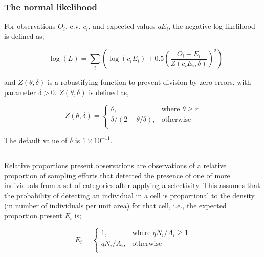{{{{{{\subsubsection*{The normal likelihood}

For observations $O_i$, c.v. $c_i$, and expected values $qE_i$, the negative log-likelihood is defined as;

\begin{equation}
 - \log \left(L \right) = \sum\limits_i \left( \log \left( c_i E_i \right) +0.5 \left( \frac{O_i-E_i}{Z\left(c_i E_i,\delta \right)}\right)^2\right)
\end{equation}

and $Z \left(\theta,\delta \right)$ is a robustifying function to prevent division by zero errors, with parameter $\delta>0$. $Z \left(\theta,\delta \right)$ is defined as,

\begin{equation}
   Z \left(\theta,\delta \right) = \begin{cases}
	  \theta, & \text{where $\theta \ge r$} \\
	  \delta/\left( 2-\theta/\delta \right), & \text{otherwise} \\  
  \end{cases}
\end{equation}

The default value of $\delta$ is $1 \times 10^{-11}$.

\subsection{}

Relative proportions present observations are observations of a relative proportion of sampling efforts that detected the presence of one of more individuals from a set of categories after applying a selectivity. This assumes that the probability of detecting an individual in a cell is proportional to the density (in number of individuals per unit area) for that cell, i.e., the expected proportion present $E_i$ is;

\begin{equation}
   E_i = \begin{cases}
	  1, & \text{where $qN_i/A_i \ge 1$} \\
	  qN_i/A_i, & \text{otherwise} \\  
  \end{cases}
\end{equation}

}}}}}}
